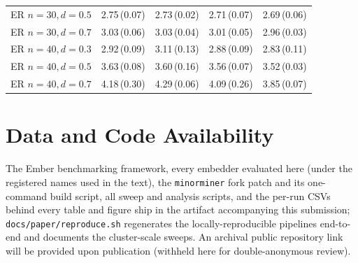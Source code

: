 \documentclass[acmsmall,anonymous,nonacm]{acmart}
\begin{document}
\begin{table}[h]
\begin{tabular}{lcccc}
ER $n{=}30,d{=}0.5$ & 2.75\,(0.07) & 2.73\,(0.02) & 2.71\,(0.07) & 2.69\,(0.06) \\
ER $n{=}30,d{=}0.7$ & 3.03\,(0.06) & 3.03\,(0.04) & 3.01\,(0.05) & 2.96\,(0.03) \\
ER $n{=}40,d{=}0.3$ & 2.92\,(0.09) & 3.11\,(0.13) & 2.88\,(0.09) & 2.83\,(0.11) \\
ER $n{=}40,d{=}0.5$ & 3.63\,(0.08) & 3.60\,(0.16) & 3.56\,(0.07) & 3.52\,(0.03) \\
ER $n{=}40,d{=}0.7$ & 4.18\,(0.30) & 4.29\,(0.06) & 4.09\,(0.26) & 3.85\,(0.07) \\
\bottomrule
\end{tabular}
\end{table}

\section*{Data and Code Availability}
The Ember benchmarking framework, every embedder evaluated here (under the
registered names used in the text), the \texttt{minorminer} fork patch and its
one-command build script, all sweep and analysis scripts, and the per-run CSVs
behind every table and figure ship in the artifact accompanying this submission;
\texttt{docs/paper/reproduce.sh} regenerates the locally-reproducible pipelines
end-to-end and documents the cluster-scale sweeps. An archival public repository
link will be provided upon publication (withheld here for double-anonymous
review).



\end{document}
